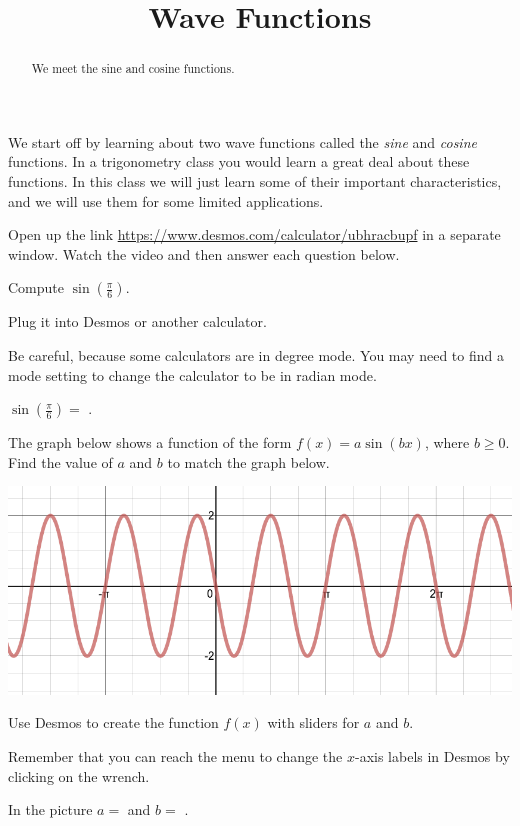 \documentclass{ximera}
\title{Wave Functions}
\begin{document}
\begin{abstract}
We meet the sine and cosine functions.
\end{abstract}
\maketitle


We start off by learning about two wave functions called the \emph{sine} and \emph{cosine} functions. In a trigonometry class you would learn a great deal about these functions. In this class we will just learn some of their important characteristics, and we will use them for some limited applications.

Open up the link \href{https://www.desmos.com/calculator/ubhracbupf}{https://www.desmos.com/calculator/ubhracbupf} in a separate window. Watch the video and then answer each question below. 

\begin{question}
Compute $\sin\left(\frac{\pi}{6}\right)$.
 
\begin{hint}
Plug it into Desmos or another calculator. 
\end{hint}
\begin{hint}
Be careful, because some calculators are in degree mode. You may need to find a mode setting to change the calculator to be in radian mode.
\end{hint}
$\sin\left(\frac{\pi}{6}\right)=$ .

\end{question}

\begin{question}
The graph below shows a function of the form $f(x)=a\sin(bx)$, where $b\ge0$. Find the value of $a$ and $b$ to match the graph below.
\begin{image}
\includegraphics{mysterysine.png}
\end{image}

\begin{hint}
Use Desmos to create the function $f(x)$ with sliders for $a$ and $b$. 
\end{hint}
\begin{hint}
Remember that you can reach the menu to change the $x$-axis labels in Desmos by clicking on the wrench.
\end{hint}
In the picture $a=$  and $b=$ .

\end{question}
\end{document}
